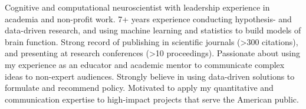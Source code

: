 

\begin{cvparagraph}

Cognitive and computational neuroscientist with leadership experience in academia and non-profit work. 7+ years experience conducting hypothesis- and data-driven research, and using machine learning and statistics to build models of brain function. Strong record of publishing in scientific journals (>300 citations), and presenting at research conferences (>10 proceedings). Passionate about using my experience as an educator and academic mentor to communicate complex ideas to non-expert audiences. Strongly believe in using data-driven solutions to formulate and recommend policy. Motivated to apply my quantitative and communication expertise to high-impact projects that serve the American public. 

\end{cvparagraph}
